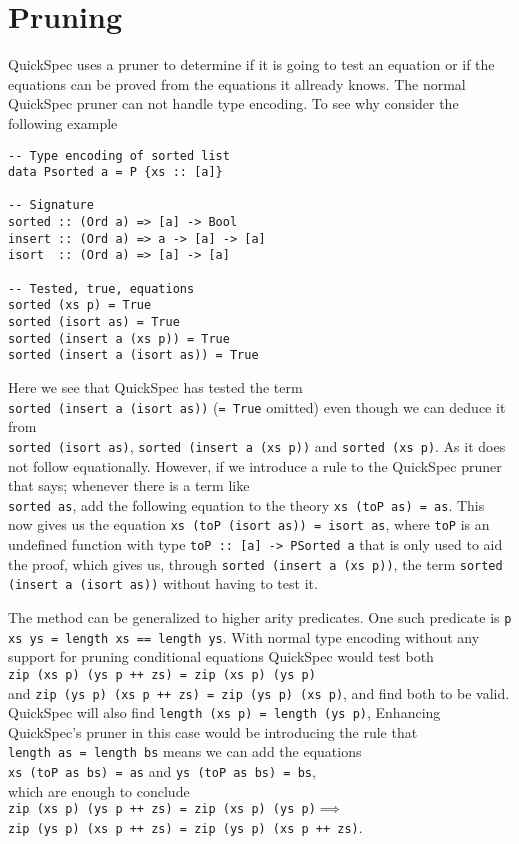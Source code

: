 \section{Pruning}
QuickSpec uses a pruner to determine if
it is going to test an equation or if the equations
can be proved from the equations it allready knows.
The normal QuickSpec pruner can not handle type encoding.
To see why consider the following example
\begin{verbatim}
-- Type encoding of sorted list
data Psorted a = P {xs :: [a]}

-- Signature
sorted :: (Ord a) => [a] -> Bool
insert :: (Ord a) => a -> [a] -> [a]
isort  :: (Ord a) => [a] -> [a]

-- Tested, true, equations
sorted (xs p) = True
sorted (isort as) = True
sorted (insert a (xs p)) = True
sorted (insert a (isort as)) = True
\end{verbatim}
Here we see that QuickSpec has tested the term
\\\texttt{sorted (insert a (isort as))} (\texttt{= True} omitted)
even though we can deduce it from
\\\texttt{sorted (isort as)},
\texttt{sorted (insert a (xs p))} and
\texttt{sorted (xs p)}. As it does not follow
equationally. However, if we introduce
a rule to the QuickSpec pruner that says;
whenever there is a term like \\\texttt{sorted as},
add the following equation to the theory
\texttt{xs (toP as) = as}. This now gives us
the equation \texttt{xs (toP (isort as)) = isort as},
where \texttt{toP} is an undefined function with type
\texttt{toP :: [a] -> PSorted a} that is only used to aid the proof,
which gives us, through \texttt{sorted (insert a (xs p))},
the term \texttt{sorted (insert a (isort as))} without
having to test it.

The method can be generalized to higher arity predicates.
One such predicate is \texttt{p xs ys = length xs == length ys}.
With normal type encoding without any support for pruning
conditional equations QuickSpec would test both
\\\texttt{zip (xs p) (ys p ++ zs) = zip (xs p) (ys p)}\\
and \texttt{zip (ys p) (xs p ++ zs) = zip (ys p) (xs p)}, and find
both to be valid.
QuickSpec will also find \texttt{length (xs p) = length (ys p)},
Enhancing QuickSpec's pruner in this case would be introducing
the rule that\\\texttt{length as = length bs} means we can add the equations
\\\texttt{xs (toP as bs) = as} and \texttt{ys (toP as bs) = bs},\\
which are enough to conclude\\
\texttt{zip (xs p) (ys p ++ zs) = zip (xs p) (ys p)}$\implies$
\\\texttt{zip (ys p) (xs p ++ zs) = zip (ys p) (xs p ++ zs)}.
